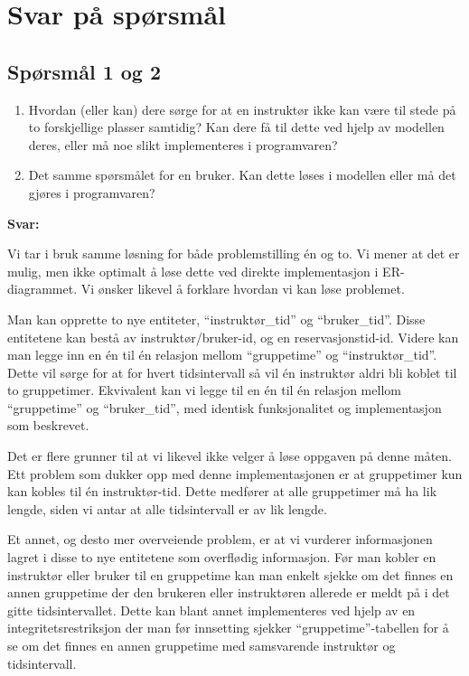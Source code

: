 \section{Svar på spørsmål}

\subsection*{Spørsmål 1 og 2}

\begin{enumerate}
    \item Hvordan (eller kan) dere sørge for at en instruktør ikke kan være til stede på to forskjellige plasser samtidig? Kan dere få til dette ved hjelp av modellen deres, eller må noe slikt implementeres i programvaren?
    \item Det samme spørsmålet for en bruker. Kan dette løses i modellen eller må det gjøres i programvaren?
\end{enumerate}

\textbf{Svar:}

Vi tar i bruk samme løsning for både problemstilling én og to. Vi mener at det er mulig, men ikke optimalt å løse dette ved direkte implementasjon i ER-diagrammet. Vi ønsker likevel å forklare hvordan vi kan løse problemet.

Man kan opprette to nye entiteter, “instruktør\_tid” og “bruker\_tid”. Disse entitetene kan bestå av instruktør/bruker-id, og en reservasjonstid-id. Videre kan man legge inn en én til én relasjon mellom “gruppetime” og “instruktør\_tid”. Dette vil sørge for at for hvert tidsintervall så vil én instruktør aldri bli koblet til to gruppetimer. Ekvivalent kan vi legge til en én til én relasjon mellom “gruppetime” og “bruker\_tid”, med identisk funksjonalitet og implementasjon som beskrevet.

Det er flere grunner til at vi likevel ikke velger å løse oppgaven på denne måten. Ett problem som dukker opp med denne implementasjonen er at gruppetimer kun kan kobles til én instruktør-tid. Dette medfører at alle gruppetimer må ha lik lengde, siden vi antar at alle tidsintervall er av lik lengde.

Et annet, og desto mer overveiende problem, er at vi vurderer informasjonen lagret i disse to nye entitetene som overflødig informasjon. Før man kobler en instruktør eller bruker til en gruppetime kan man enkelt sjekke om det finnes en annen gruppetime der den brukeren eller instruktøren allerede er meldt på i det gitte tidsintervallet. Dette kan blant annet implementeres ved hjelp av en integritetsrestriksjon der man før innsetting sjekker “gruppetime”-tabellen for å se om det finnes en annen gruppetime med samsvarende instruktør og tidsintervall.

